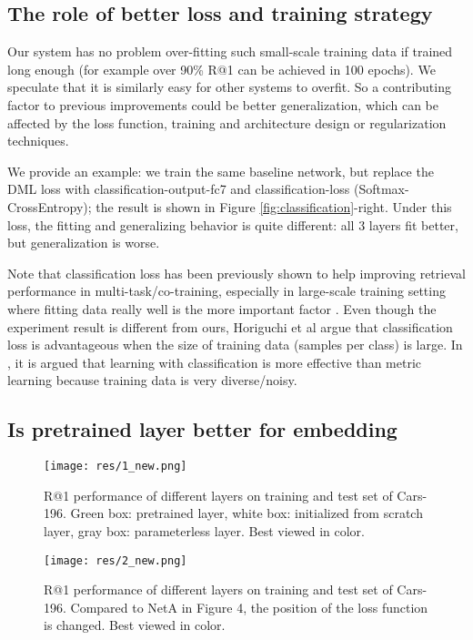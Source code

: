 \documentclass[10pt,twocolumn,letterpaper]{article}
\begin{document}
\subsection{The role of better loss and training strategy}





Our system has no problem over-fitting such small-scale training data if trained long enough (for example over 90\% R@1 can be achieved in 100 epochs). We speculate that it is similarly easy for other systems to overfit. So a contributing factor to previous improvements could be better generalization, which can be affected by the loss function, training and architecture design or regularization techniques.

We provide an example: we train the same baseline network, but replace the DML loss with classification-output-fc7 and classification-loss (Softmax-CrossEntropy); the result is shown in Figure \ref{fig:classification}-right. Under this loss, the fitting and generalizing behavior is quite different: all 3 layers fit better, but generalization is worse.

Note that classification loss has been previously shown to help improving retrieval performance in multi-task/co-training, especially in large-scale training setting where fitting data really well is the more important factor \cite{Parkhi15, wen2016discriminative}. Even though the experiment result is different from ours, Horiguchi et al \cite{horiguchi2017significance} argue that classification loss is advantageous when the size of training data (samples per class) is large. In \cite{vo2017revisiting}, it is argued that learning with classification is more effective than metric learning because training data is very diverse/noisy.


\subsection{Is pretrained layer better for embedding}

\begin{figure*}[h!]
\begin{center}
  \texttt{[image: res/1\_new.png]}
  \vspace{5pt}
  \caption{R@1 performance of different layers on training and test set of Cars-196. Green box: pretrained layer, white box: initialized from scratch layer, gray box: parameterless layer. Best viewed in color.}
  \label{fig:analysize1}
\end{center}

\begin{center}
  \texttt{[image: res/2\_new.png]}
  \vspace{5pt}
  \caption{R@1 performance of different layers on training and test set of Cars-196. Compared to NetA in Figure 4, the position of the loss function is changed. Best viewed in color.}
  \label{fig:analysize2}
\end{center}
\end{figure*}
\end{document}
